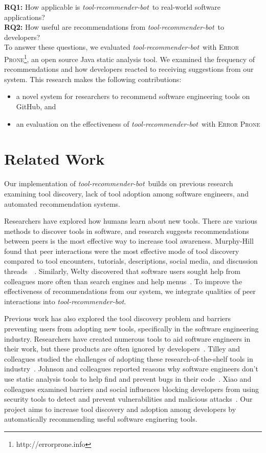 \documentclass[conference]{IEEEtran}
\newcommand{\tool}{\textsl{tool-recommender-bot}}
\begin{document}
\noindent
\textbf{RQ1:} How applicable is \tool~to real-world software applications?  \\ 
\textbf{RQ2:} How useful are recommendations from \tool~to developers?  \\

To answer these questions, we evaluated \tool~with \textsc{Error Prone}\footnote{http://errorprone.info}, an open source Java static analysis tool. We examined the frequency of recommendations and how developers reacted to receiving suggestions from our system. This research makes the following contributions:

\begin{itemize}
 \item a novel system for researchers to recommend software engineering tools on GitHub, and
 \item an evaluation on the effectiveness of \tool~with \textsc{Error Prone}
 \end{itemize}

\section{Related Work}
Our implementation of \tool~builds on previous research examining tool discovery, lack of tool adoption among software engineers, and automated recommendation systems.

Researchers have explored how humans learn about new tools. There are various methods to discover tools in software, and research suggests recommendations between peers is the most effective way to increase tool awareness. Murphy-Hill found that peer interactions were the most effective mode of tool discovery compared to tool encounters, tutorials, descriptions, social media, and discussion threads~\cite{MurphyHill2011PeerInteraction}~\cite{Murphy-Hill2015HowDoUsers}. Similarly, Welty discovered that software users sought help from colleagues more often than search engines and help menus~\cite{Welty2011Help}. To improve the effectiveness of recommendations from our system, we integrate qualities of peer interactions into \tool.

Previous work has also explored the tool discovery problem and barriers preventing users from adopting new tools, specifically in the software engineering industry. Researchers have created numerous tools to aid software engineers in their work, but these products are often ignored by developers~\cite{Ivanov2017Gaps}. Tilley and colleagues studied the challenges of adopting these research-of-the-shelf tools in industry~\cite{Tilley2003ROTS}. Johnson and colleagues reported reasons why software engineers don't use static analysis tools to help find and prevent bugs in their code~\cite{Johnson2013Why}. Xiao and colleagues examined barriers and social influences blocking developers from using security tools to detect and prevent vulnerabilities and malicious attacks~\cite{Xiao2014Security}. Our project aims to increase tool discovery and adoption among developers by automatically recommending useful software enginering tools.
\end{document}
